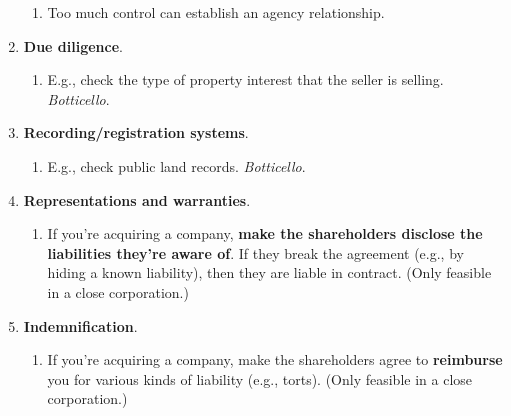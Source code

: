 \begin{enumerate}
\begin{enumerate}
        \item Too much control can establish an agency relationship. 
    \end{enumerate}
    \item \textbf{Due diligence}.
    \begin{enumerate}
        \item E.g., check the type of property interest that the seller is 
        selling.  \emph{Botticello}.
    \end{enumerate}
    \item \textbf{Recording/registration systems}.
    \begin{enumerate}
        \item E.g., check public land records. \emph{Botticello}.
    \end{enumerate}
    \item \textbf{Representations and warranties}.
    \begin{enumerate}
        \item If you're acquiring a company, \textbf{make the shareholders 
        disclose the liabilities they're aware of}. If they break the 
        agreement (e.g., by hiding a known liability), then they are liable in 
        contract. (Only feasible in a close corporation.)
    \end{enumerate}
    \item \textbf{Indemnification}.
    \begin{enumerate}
        \item If you're acquiring a company, make the shareholders agree to 
        \textbf{reimburse} you for various kinds of liability (e.g., torts). 
        (Only feasible in a close corporation.)
    \end{enumerate}
\end{enumerate}
